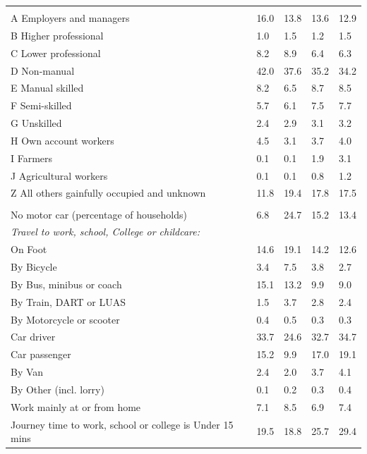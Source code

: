 \documentclass{article}
\begin{document}
\begin{table}[h]
\begin{tabular}{KTTTT}
\hline
    \\ 
    \hline
A Employers and managers & 16.0& 13.8& 13.6& 12.9\\
B Higher professional & 1.0& 1.5& 1.2& 1.5\\
C Lower professional & 8.2& 8.9& 6.4& 6.3\\
D Non-manual & 42.0& 37.6& 35.2& 34.2\\
E Manual skilled & 8.2& 6.5& 8.7& 8.5\\
F Semi-skilled & 5.7& 6.1& 7.5& 7.7\\
G Unskilled & 2.4& 2.9& 3.1& 3.2\\
H Own account workers & 4.5& 3.1& 3.7& 4.0\\
I Farmers & 0.1& 0.1& 1.9& 3.1\\
J Agricultural workers & 0.1& 0.1& 0.8& 1.2\\
Z All others gainfully occupied and unknown & 11.8& 19.4& 17.8& 17.5\\
\hline
{}\hline
    \\ 
    \hline
No motor car (percentage of households) &  6.8& 24.7& 15.2& 
13.4\\
    \hline 
\emph{Travel to work, school, College or childcare:} & & & \\
\quad On Foot & 14.6& 19.1& 14.2& 12.6\\ 
\quad By Bicycle & 3.4& 7.5& 3.8& 2.7\\ 
\quad By Bus, minibus or coach & 15.1& 13.2&  9.9&  9.0\\
\quad By Train, DART or LUAS & 1.5& 3.7& 2.8& 2.4\\
\quad By Motorcycle or scooter & 0.4& 0.5& 0.3& 0.3\\
\quad Car driver & 33.7 & 24.6& 32.7& 34.7\\
\quad Car passenger & 15.2&  9.9& 17.0& 19.1\\
\quad By Van & 2.4& 2.0& 3.7& 4.1\\
\quad By Other (incl. lorry) & 0.1& 0.2& 0.3& 0.4\\
    \hline
Work mainly at or from home & 7.1& 8.5& 6.9& 7.4\\
Journey time to work, school or college is Under 15 mins & 19.5& 18.8& 25.7& 29.4\\

\end{tabular}
\end{table}
\end{document}
